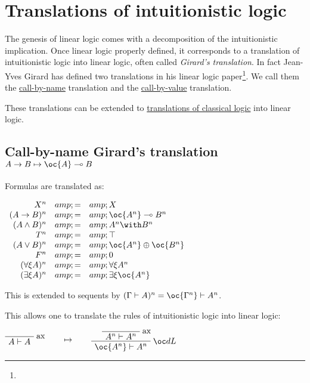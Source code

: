 \section{Translations of intuitionistic logic}\label{translations-of-intuitionistic-logic}

The genesis of linear logic comes with a decomposition of the
intuitionistic implication. Once linear logic properly defined, it
corresponds to a translation of intuitionistic logic into linear logic,
often called \emph{Girard's translation}. In fact Jean-Yves Girard has
defined two translations in his linear logic paper\footnote{}. We call
them the \url{call-by-name} translation and the \url{call-by-value}
translation.

These translations can be extended to
\href{translations_of_classical_logic}{translations of classical logic}
into linear logic.

\subsection{\texorpdfstring{Call-by-name Girard's translation
\(A\imp B \mapsto \oc{A}\limp B\)}{Call-by-name Girard's translation A\textbackslash{}imp B \textbackslash{}mapsto \textbackslash{}oc\{A\}\textbackslash{}limp B}}\label{call-by-name-girards-translation-aimp-b-mapsto-ocalimp-b}

Formulas are translated as:

\(\begin{array}{rcl}
X^n &amp; = &amp; X \\
(A\imp B)^n &amp; = &amp; \oc{A^n}\limp B^n \\
(A\wedge B)^n &amp; = &amp; A^n \with B^n \\
T^n &amp; = &amp; \top \\
(A\vee B)^n &amp; = &amp; \oc{A^n}\plus\oc{B^n} \\
F^n &amp; = &amp; \zero \\
(\forall\xi A)^n &amp; = &amp; \forall\xi A^n \\
(\exists\xi A)^n &amp; = &amp; \exists\xi \oc{A^n}
\end{array}\)

This is extended to sequents by
\((\Gamma\vdash A)^n = \oc{\Gamma^n}\vdash A^n\).

This allows one to translate the rules of intuitionistic logic into
linear logic:

\(\LabelRule{\rulename{ax}}
\NulRule{A\vdash A}
\DisplayProof
\qquad\mapsto\qquad
\LabelRule{\rulename{ax}}
\NulRule{A^n\vdash A^n}
\LabelRule{\oc d L}
\UnaRule{\oc{A^n}\vdash A^n}
\DisplayProof\)

